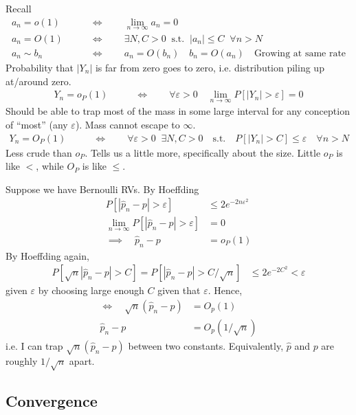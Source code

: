 \documentclass[12pt]{article}
\theoremstyle{plain}
\theoremstyle{definition}
\theoremstyle{remark}
\newcommand{\limn}{\lim_{n\rightarrow\infty}}
\begin{document}
Recall
\begin{align*}
  a_n = o(1)
  \qquad&\iff\qquad
  \limn
  a_n
  = 0
  \\
  a_n = O(1)
  \qquad&\iff\qquad
  \exists N,C>0
  \;\;\text{s.t.}\;\;
  |a_n|\leq C
  \;\;\forall n>N
  \\
  a_n
  \sim
  b_n
  \qquad&\iff\qquad
  a_n = O(b_n)
  \quad
  b_n = O(a_n)
  \quad
  \text{Growing at same rate}
\end{align*}
Probability that $|Y_n|$ is far from zero goes to zero, i.e.
distribution piling up at/around zero.
\begin{align*}
  Y_n = o_P(1)
  \qquad&\iff\qquad
  \forall \varepsilon>0
  \quad
  \limn
  P[|Y_n|>\varepsilon]
  =0
\end{align*}
Should be able to trap most of the mass in some large interval for any
conception of ``most'' (any $\varepsilon$).
Mass cannot escape to $\infty$.
\begin{align*}
  Y_n = O_P(1)
  \qquad&\iff\qquad
  \forall \varepsilon>0
  \;\;\exists N,C>0
  \quad\text{s.t.}\quad
  P[|Y_n|>C]
  \leq
  \varepsilon
  \quad
  \forall n>N
\end{align*}
Less crude than $o_P$. Tells us a little more, specifically about the
size.
Little $o_P$ is like $<$, while $O_P$ is like $\leq$.

Suppose we have Bernoulli RVs.
By Hoeffding
\begin{align*}
  P[|\hat{p}_n-p|>\varepsilon]
  &\leq
  2e^{-2n\varepsilon^2}
  \\
  \limn
  P[|\hat{p}_n-p|>\varepsilon]
  &=
  0
  \\
  \implies\quad
  \hat{p}_n-p
  &=
  o_P(1)
\end{align*}
By Hoeffding again,
\begin{align*}
  P[\sqrt{n}|\hat{p}_n-p|>C]
  =
  P[|\hat{p}_n-p|>C/\sqrt{n}]
  &\leq
  2e^{-2C^2}
  <\varepsilon
\end{align*}
given $\varepsilon$ by choosing large enough $C$ given that
$\varepsilon$.
Hence,
\begin{align*}
  \iff\quad
  \sqrt{n}(\hat{p}_n-p)
  &=
  O_p(1)
  \\
  \hat{p}_n-p
  &=
  O_p(1/\sqrt{n})
\end{align*}
i.e. I can trap $\sqrt{n}(\hat{p}_n-p)$ between two constants.
Equivalently, $\hat{p}$ and $p$ are roughly $1/\sqrt{n}$ apart.



\clearpage
\subsection{Convergence}
\end{document}
